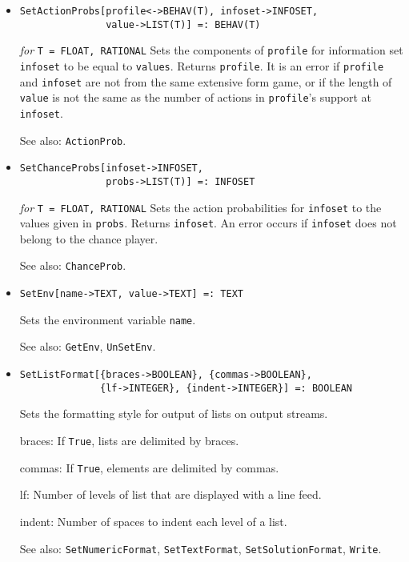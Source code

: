 \begin{itemize}
\item{}
\protect \large \begin{verbatim} 
SetActionProbs[profile<->BEHAV(T), infoset->INFOSET,
               value->LIST(T)] =: BEHAV(T) 
\end{verbatim}\normalsize

{\it for} {\tt T = FLOAT, RATIONAL}
\bd
Sets the components of \verb+profile+ for
information set \verb+infoset+ to be equal to \verb+values+.
Returns \verb+profile+.  It is an error if \verb+profile+ and \verb+infoset+
are not from the same extensive form game, or if the length of
\verb+value+ is not the same as the number of actions in \verb+profile+'s
support at \verb+infoset+.
\item [See also:] \verb+ActionProb+.
\ed

\item{}
\protect \large \begin{verbatim} 
SetChanceProbs[infoset->INFOSET, 
               probs->LIST(T)] =: INFOSET
\end{verbatim}\normalsize

{\it for} {\tt T = FLOAT, RATIONAL}
\bd
Sets the action probabilities for 
\verb+infoset+ to the values given in \verb+probs+.  Returns \verb+infoset+. 
An error occurs if \verb+infoset+ does not belong to the chance player.
\item [See also:] \verb+ChanceProb+.
\ed

\item{}
\protect \large \begin{verbatim}
SetEnv[name->TEXT, value->TEXT] =: TEXT
\end{verbatim} \normalsize

\bd
Sets the environment variable \verb+name+.
\item [See also:] \verb+GetEnv+, \verb+UnSetEnv+.
\ed

\item{}
\protect \large \begin{verbatim}
SetListFormat[{braces->BOOLEAN}, {commas->BOOLEAN},
              {lf->INTEGER}, {indent->INTEGER}] =: BOOLEAN
\end{verbatim} \normalsize

\bd
Sets the formatting style for output of lists on output streams.
\bd
\item [braces:] If \verb+True+, lists are delimited by braces.
\item [commas:] If \verb+True+, elements are delimited by commas.
\item [lf:] Number of levels of list that are displayed with a line feed.
\item [indent:] Number of spaces to indent each level of a list.
\ed
\item [See also:] \verb+SetNumericFormat+, \verb+SetTextFormat+,
\verb+SetSolutionFormat+, \verb+Write+.
\ed


\end{itemize}
